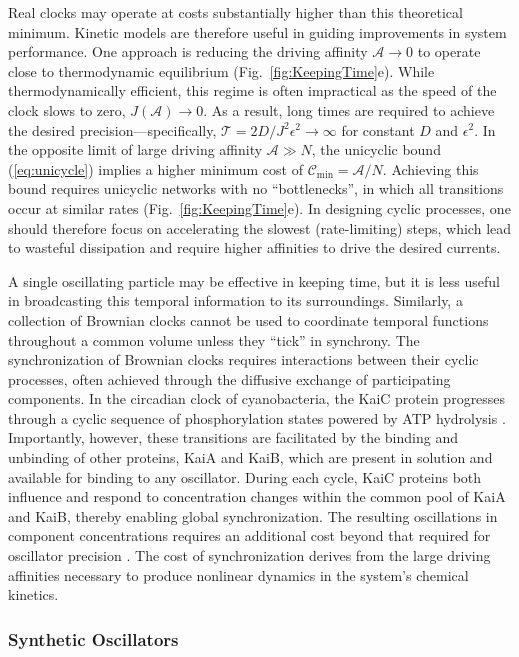 \begin{appendices}
Real clocks may operate at costs substantially higher than this theoretical minimum.  Kinetic models are therefore useful in guiding improvements in system performance. One approach is reducing the driving affinity $\mathcal{A}\rightarrow 0$ to operate close to thermodynamic equilibrium (Fig.~\ref{fig:KeepingTime}e).  While thermodynamically efficient, this regime is often impractical as the speed of the clock slows to zero, $J(\mathcal{A})\rightarrow0$.  As a result, long times are required to achieve the desired precision---specifically, $\mathcal{T}=2D/J^2\epsilon^2\rightarrow\infty$ for constant $D$ and $\epsilon^2$.  In the opposite limit of large driving affinity $\mathcal{A}\gg N$, the unicyclic bound (\ref{eq:unicycle}) implies a higher minimum cost of $\mathcal{C}_{\min}=\mathcal{A}/N$.  Achieving this bound requires unicyclic networks with no ``bottlenecks'', in which all transitions occur at similar rates (Fig.~\ref{fig:KeepingTime}e). In designing cyclic processes, one should therefore focus on accelerating the slowest (rate-limiting) steps, which lead to wasteful dissipation and require higher affinities to drive the desired currents.

A single oscillating particle may be effective in keeping time, but it is less useful in broadcasting this temporal information to its surroundings. Similarly, a collection of Brownian clocks cannot be used to coordinate temporal functions throughout a common volume unless they ``tick'' in synchrony.  The synchronization of Brownian clocks requires interactions between their cyclic processes, often achieved through the diffusive exchange of participating components.  In the circadian clock of cyanobacteria, the KaiC protein progresses through a cyclic sequence of phosphorylation states powered by ATP hydrolysis \cite{Dong2008}. Importantly, however, these transitions are facilitated by the binding and unbinding of other proteins, KaiA and KaiB, which are present in solution and available for binding to any oscillator.  During each cycle, KaiC proteins both influence and respond to concentration changes within the common pool of KaiA and KaiB, thereby enabling global synchronization.  The resulting oscillations in component concentrations requires an additional cost beyond that required for oscillator precision \cite{Cao2015}.  The cost of synchronization derives from the large driving affinities necessary to produce nonlinear dynamics in the system's chemical kinetics.

\subsubsection{Synthetic Oscillators}


\end{appendices}
